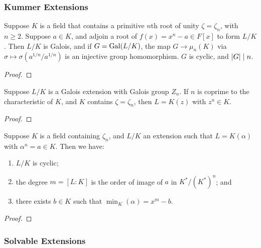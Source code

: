 \subsubsection*{Kummer Extensions}

\begin{proposition}
    Suppose \(K\) is a field
    that contains a primitive \(n\)th root of unity \(\zeta = \zeta_n\),
    with \(n \geq 2\).
    Suppose \(a \in K\), and adjoin a root of \(f(x) = x^n - a \in F[x]\)
    to form \(L/K\).
    Then \(L/K\) is Galois, and if \(G = \operatorname{Gal}(L/K)\),
    the map \(G \to \mu_n(K)\) via \(\sigma \mapsto \sigma(a^{1/n}/a^{1/n})\)
    is an injective group homomorphism.
    \(G\) is cyclic, and \(\abs{G} \mid n\).
\end{proposition}
\begin{proof}
\end{proof}

\begin{lemma}
    Suppose \(L/K\) is a Galois extension with Galois group \(Z_n\).
    If \(n\) is coprime to the characteristic of \(K\),
    and \(K\) contains \(\zeta = \zeta_n\),
    then \(L = K(z)\) with \(z^n \in K\).
\end{lemma}
\begin{proof}
\end{proof}
\begin{proposition}
    Suppose \(K\) is a field containing \(\zeta_n\),
    and \(L/K\) an extension such that \(L = K(\alpha)\) with \(\alpha^n = a \in K\).
    Then we have:
    \begin{enumerate}[label={(\alph*)}, itemsep=0mm]
        \item \(L/K\) is cyclic;
        \item the degree \(m = [L:K]\) is the order of image of \(a\) in \(K^\ast/{(K^\ast)}^n\); and
        \item there exists \(b \in K\) such that \(\min_K(\alpha) = x^m - b\).
    \end{enumerate}
\end{proposition}
\begin{proof}
\end{proof}

\subsubsection*{Solvable Extensions}

